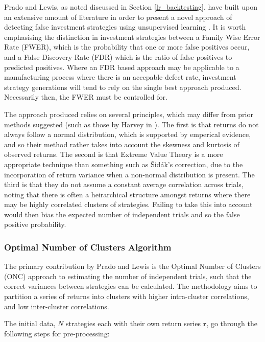 \documentclass[a4paper,11pt,oneside]{article}
\theoremstyle{plain}
\theoremstyle{definition}
\begin{document}
	Prado and Lewis, as noted discussed in Section \ref{lr_backtesting}, have built upon an extensive amount of literature in order to present a novel approach of detecting false investment strategies using unsupervised learning \cite{PradoDSR}. It is worth emphasising the distinction in investment strategies between a Family Wise Error Rate (FWER), which is the  probability that one or more false positives occur, and a False Discovery Rate (FDR) which is the ratio of false positives to predicted positives. Where an FDR based approach may be applicable to a manufacturing process where there is an accepable defect rate, investment strategy generations will tend to rely on the single best approach produced. Necessarily then, the FWER must be controlled for. \newline
	
	The approach produced relies on several principles, which may differ from prior methods suggested (such as those by Harvey in  \cite{Harvey}). The first is that returns do not always follow a normal distribution, which is supported by emperical evidence, and so their method rather takes into account the skewness and kurtosis of observed returns. The second is that Extreme Value Theory is a more appropriate technique than something such as Šidák's correction, due to the incorporation of return variance when a non-normal distribution is present. The third is that they do not assume a  constant average correlation across trials, noting that there is often a heirarchical structure amongst returns where there may be highly correlated clusters of strategies. Failing to take this into account would then bias the expected number of independent trials and so the false positive probability.
	
	\subsubsection{Optimal Number of Clusters Algorithm}
	
	The primary contribution by Prado and Lewis is the Optimal Number of Clusters (ONC) approach to estimating the number of independent trials, such that the correct variances between strategies can be calculated. The methodology aims to partition a series of returns into clusters with higher intra-cluster correlations, and low inter-cluster correlations. \newline
	
	The initial data, $N$ strategies each with their own return series $\mathbf{r}$, go through the following steps for pre-processing:
		
\end{document}
